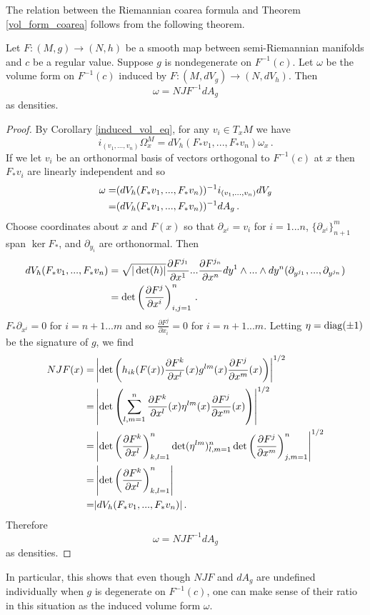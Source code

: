 The relation between the Riemannian coarea formula and Theorem \ref{vol_form_coarea} follows from the following theorem.
\begin{theorem}
Let $F:(M,g)\rightarrow (N,h)$  be a smooth map between semi-Riemannian manifolds and $c$ be a regular value.  Suppose $g$ is nondegenerate on $F^{-1}(c)$.  Let $\omega$ be the volume form on $F^{-1}(c)$ induced by $F:(M,dV_g)\rightarrow (N,dV_h)$.  Then
\begin{equation}
\omega=NJF^{-1}dA_g
\end{equation}
as densities.
\end{theorem}
\begin{proof}
By Corollary \ref{induced_vol_eq}, for any  $v_i\in T_xM$ we have
\begin{equation}
i_{(v_1,...,v_n)}\Omega^M_x=dV_h(F_*v_1,...,F_*v_n)\omega_x\,.
\end{equation}
If we let $v_i$ be an orthonormal basis of vectors orthogonal to $F^{-1}(c)$ at $x$ then $F_*v_i$ are linearly independent and so
\begin{align}
\omega=&(dV_h(F_*v_1,...,F_*v_n))^{-1}i_{(v_1,...,v_n)}dV_g\\
=&(dV_h(F_*v_1,...,F_*v_n))^{-1}dA_g\,.\notag
\end{align}
Choose coordinates about $x$ and $F(x)$ so that $\partial_{x^i}=v_i$ for $i=1...n$, $\{\partial_{x^i}\}_{n+1}^m$ span $\ker F_*$, and $\partial_{y_i}$ are orthonormal.  Then 
\begin{align}
dV_h(F_*v_1,...,F_*v_n)&=\sqrt{|\det(h)|}\frac{\partial F^{j_1}}{\partial x^1}...\frac{\partial F^{j_n}}{\partial x^n}dy^1\wedge...\wedge dy^n(\partial_{y^{j_1}},...,\partial_{y^{j_n}})\\
&=\det\left(\frac{\partial F^{j}}{\partial x^i}\right)_{i,j=1}^n\,.\notag
\end{align}
$F_*\partial_{x^i}=0$ for $i=n+1...m$ and so $\frac{\partial F^j}{\partial x_i}=0$ for $i=n+1...m$.  Letting $\eta=\mathrm{diag}(\pm 1)$ be the signature of $g$, we find
\begin{align}
NJF(x)=&\left|\det\left(h_{ik}(F(x))\frac{\partial F^k}{\partial x^l}(x)g^{lm}(x)\frac{\partial F^j}{\partial x^m}(x)\right)\right|^{1/2}\\
=&\left|\det\left(\sum_{l,m=1}^n\frac{\partial F^k}{\partial x^l}(x)\eta^{lm}(x)\frac{\partial F^j}{\partial x^m}(x)\right)\right|^{1/2}\notag\\
=&\left|\det\left(\frac{\partial F^k}{\partial x^l}\right)_{k,l=1}^n\det(\eta^{lm})_{l,m=1}^n\det\left(\frac{\partial F^j}{\partial x^m}\right)_{j,m=1}^n\right|^{1/2}\notag\\
=&\left|\det\left(\frac{\partial F^k}{\partial x^l}\right)_{k,l=1}^n\right|\notag\\
=&|dV_h(F_*v_1,...,F_*v_n)|\,.\notag
\end{align}
Therefore 
\begin{equation}
\omega=NJF^{-1}dA_g
\end{equation}
as densities.
\end{proof}
In particular, this shows that even though $NJF$ and $dA_g$ are undefined individually when $g$ is degenerate on $F^{-1}(c)$, one can make sense of their ratio in this situation as the induced volume form $\omega$.


